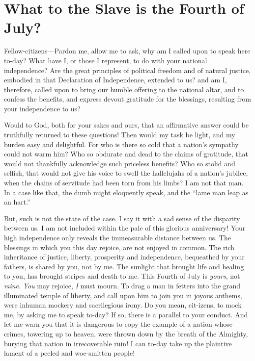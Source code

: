 
\author{Frederick Douglass}
\chapter{What to the Slave is the Fourth of July?}

\begin{abstract}{c} Extract from an Oration, at Rochester,
July 5, 1852. \end{abstract}

\noindent Fellow-citizens---Pardon me, allow me to ask, why am I
called upon to speak here to-day? What have I, or those I represent,
to do with your national independence? Are the great principles of
political freedom and of natural justice, embodied in that Declaration
of Independence, extended to us? and am I, therefore, called upon to
bring our humble offering to the national altar, and to confess the
benefits, and express devout gratitude for the blessings, resulting
from your independence to us?

Would to God, both for your sakes and ours, that an affirmative answer
could be truthfully returned to these questions! Then would my task be
light, and my burden easy and delightful. For who is there so cold
that a nation's sympathy could not warm him? Who so obdurate and dead
to the claims of gratitude, that would not thankfully acknowledge such
priceless benefits? Who so stolid and selfish, that would not give his
voice to swell the hallelujahs of a nation's jubilee, when the chains
of servitude had been torn from his limbs? I am not that man. In a
case like that, the dumb might eloquently speak, and the ``lame man
leap as an hart.''

But, such is not the state of the case. I say it with a sad sense of
the disparity between us. I am not included within the pale of this
glorious anniversary! Your high independence only reveals the
immeasurable distance between us. The blessings in which you this
day rejoice, are not enjoyed in common. The rich inheritance of
justice, liberty, prosperity and independence, bequeathed by your
fathers, is shared by you, not by me. The sunlight that brought life
and healing to you, has brought stripes and death to me. This Fourth
of July is \textit{yours}, not \textit{mine}. \textit{You} may
rejoice, \textit{I} must mourn. To drag a man in fetters into the
grand illuminated temple of liberty, and call upon him to join you in
joyous anthems, were inhuman mockery and sacrilegious irony. Do you
mean, cit-izens, to mock me, by asking me to speak to-day?
If so, there is a parallel to your conduct. And let me warn you that
it is dangerous to copy the example of a nation whose crimes, towering
up to heaven, were thrown down by the breath of the Almighty, burying
that nation in irrecoverable ruin! I can to-day take up the plaintive
lament of a peeled and woe-smitten people!

